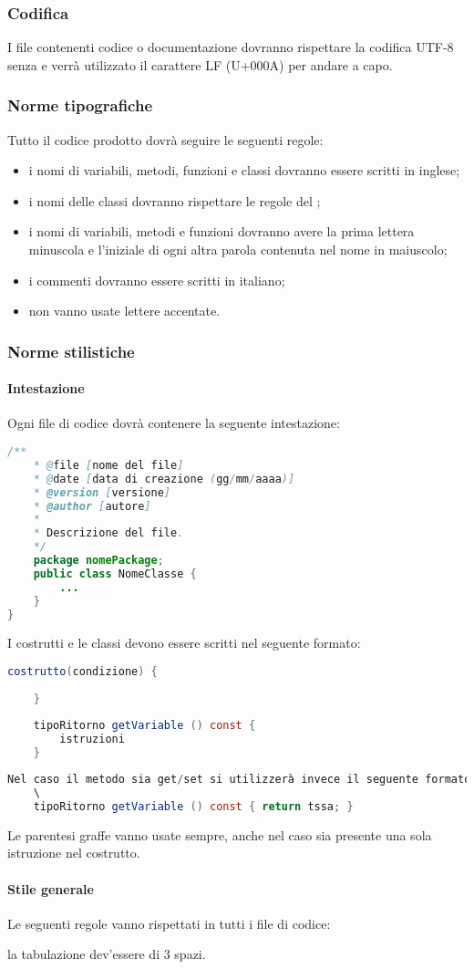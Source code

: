 \subsubsection{Codifica}
\label{sec:2.1.4}
	I file contenenti codice o documentazione dovranno rispettare la codifica UTF-8 senza  e verrà utilizzato il carattere LF (U+000A) per andare a capo.

	\subsubsection{Norme tipografiche}
	\label{sec:2.1.4.1}
			Tutto il codice prodotto dovrà seguire le seguenti regole:
			\begin{itemize}
				\item i nomi di variabili, metodi, funzioni e classi dovranno essere scritti in inglese;
				\item i nomi delle classi dovranno rispettare le regole del ;
				\item i nomi di variabili, metodi e funzioni dovranno avere la prima lettera minuscola e l'iniziale di ogni altra parola contenuta nel nome in maiuscolo;
				\item i commenti dovranno essere scritti in italiano;
				\item non vanno usate lettere accentate.
		\end{itemize}
	\subsubsection{Norme stilistiche}
		\paragraph{Intestazione}
		Ogni file di codice dovrà contenere la seguente intestazione:
		\begin{lstlisting}[language=Java, commentstyle=\color{green}, keywordstyle=\color{blue}]
	/**
	* @file [nome del file]
	* @date [data di creazione (gg/mm/aaaa)]
	* @version [versione]
	* @author [autore]
	*
	* Descrizione del file.
	*/
	package nomePackage;
	public class NomeClasse {
		...
	}
}
	\end{lstlisting}
	I costrutti e le classi devono essere scritti nel seguente formato:
	\begin{lstlisting}[language=Java, commentstyle=\color{green}, keywordstyle=\color{blue}]
	costrutto(condizione) {
	
	}
	
	tipoRitorno getVariable () const { 
		istruzioni
	}	
	\end{lstlisting}
	\begin{lstlisting}[language=Java, commentstyle=\color{green}, keywordstyle=\color{blue}]
	Nel caso il metodo sia get/set si utilizzerà invece il seguente formato:
	\
	tipoRitorno getVariable () const { return tssa; }
	\end{lstlisting}
	Le parentesi graffe vanno usate sempre, anche nel caso sia presente una sola istruzione nel costrutto.
		\paragraph{Stile generale}
		Le seguenti regole vanno rispettati in tutti i file di codice:
			\item la tabulazione dev'essere di 3 spazi.